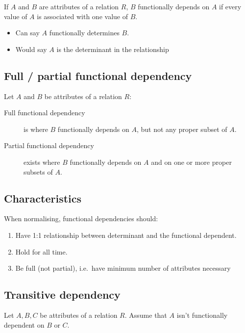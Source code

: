 \documentclass[slides]{pgnotes}
\begin{document}
If \(A\) and \(B\) are attributes of a relation \(R\), \(B\)
functionally depends on \(A\) if every value of \(A\) is associated with
one value of \(B\).

\begin{itemize}
\item
  Can say \(A\) functionally determines \(B\).
\item
  Would say \(A\) is the determinant in the relationship
\end{itemize}

\subsection{Full / partial functional
dependency}\label{full-partial-functional-dependency}

Let \(A\) and \(B\) be attributes of a relation \(R\):

\begin{description}
\item[Full functional dependency]
is where \(B\) functionally depends on \(A\), but not any proper subset
of \(A\).
\item[Partial functional dependency]
exists where \(B\) functionally depends on \(A\) and on one or more
proper subsets of \(A\).
\end{description}

\subsection{Characteristics}\label{characteristics}

When normalising, functional dependencies should:

\begin{enumerate}
\def\labelenumi{\arabic{enumi}.}
\item
  Have 1:1 relationship between determinant and the functional
  dependent.
\item
  Hold for all time.
\item
  Be full (not partial), i.e.~have minimum number of attributes
  necessary
\end{enumerate}

\subsection{Transitive dependency}\label{transitive-dependency}

Let \(A, B, C\) be attributes of a relation \(R\). Assume that \(A\)
isn't functionally dependent on \(B\) or \(C\).
\end{document}
